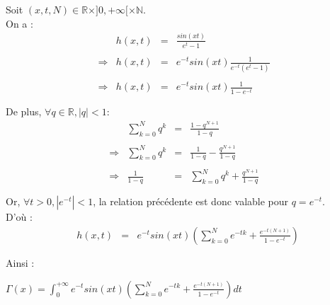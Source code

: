 Soit $(x, t, N)\in \mathbb{R}\times]0, +\infty[\times\mathbb{N}$.\\
On a :
\[
  \begin{array}{rrlc}
                & h(x, t) & = & \frac{sin(xt)}{e^t-1}                \\\\
    \Rightarrow & h(x, t) & = & e^{-t}sin(xt)\frac{1}{e^{-t}(e^t-1)} \\\\
    \Rightarrow & h(x, t) & = & e^{-t}sin(xt)\frac{1}{1-e^{-t}}      \\\\
  \end{array}
\]
De plus, $\forall q\in \mathbb{R}, |q|<1 :$
\[
  \begin{array}{rrlc}
                & \sum\limits_{k=0}^{N}q^k & = & \frac{1-q^{N+1}}{1-q}                          \\\\
    \Rightarrow & \sum\limits_{k=0}^{N}q^k & = & \frac{1}{1-q} - \frac{q^{N+1}}{1-q}            \\\\
    \Rightarrow & \frac{1}{1-q}            & = & \sum\limits_{k=0}^{N}q^k + \frac{q^{N+1}}{1-q} \\\\
  \end{array}
\]
Or, $\forall t>0, |e^{-t}| < 1$, la relation précédente est donc valable pour $q = e^{-t}$.\\
D'où :
\[
  \begin{array}{rrlc}
     & h(x, t) & = & e^{-t}sin(xt)\left(\sum\limits_{k=0}^{N}e^{-tk} + \frac{e^{-t(N+1)}}{1-e^{-t}}\right) \\\\
  \end{array}
\]
Ainsi :
\begin{result}
  $\Gamma(x) = \int_{0}^{+\infty} {e^{-t}sin(xt)\left(\sum\limits_{k=0}^{N}e^{-tk} + \frac{e^{-t(N+1)}}{1-e^{-t}}\right)dt}$
\end{result}
